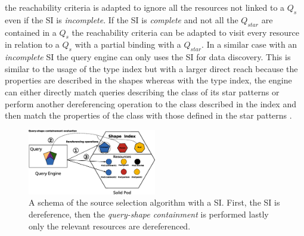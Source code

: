 the reachability criteria is adapted to ignore all the resources not linked to a $Q_{s}$ even if the SI is \emph{incomplete}.
If the SI is \emph{complete} and not all the $Q_{star}$ are contained in a $Q_{s}$ the reachability criteria can be adapted
to visit every resource in relation to a $Q_{s}$ with a partial binding with a $Q_{star}$.
In a similar case with an \emph{incomplete} SI the query engine can only uses the SI for data discovery.
This is similar to the usage of the type index but with a larger direct reach because the properties are described in the shapes
whereas with the type index, the engine can either directly match queries describing the class of its star patterns or perform
another dereferencing operation to the class described in the index and then match the properties of the class with those defined in the star patterns \cite{Taelman2023}.

\begin{figure}
    \centering
    \includegraphics[width=0.5\textwidth]{figure/shape_containement}
    \caption{A schema of the source selection algorithm with a SI. First, the SI is dereference, 
    then the \emph{query-shape containment} is performed lastly only the relevant resources are dereferenced.}
    \label{fig:shape_index}
\end{figure}
